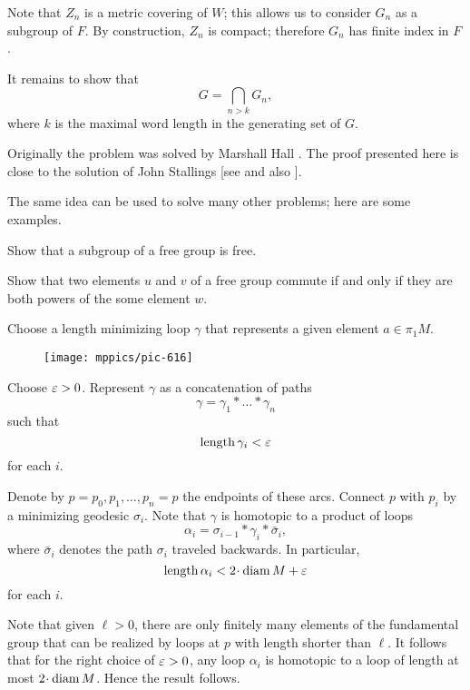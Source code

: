 Note that $Z_n$ is a metric covering of $W$;
this allows us to consider $G_n$ as a subgroup of $F$.
By construction, $Z_n$ is compact;
therefore $G_n$ has finite index in $F$.


It remains to show that 
\[G=\bigcap_{n>k} G_n,\]
where $k$ is the maximal word length in the generating set of $G$.
\qeds

Originally the problem was solved by Marshall Hall \cite{hall}.
The proof presented here is close to the solution of John Stallings [see  and also ].

The same idea can be used to solve many other problems; here are some examples.

\begin{pr}
 Show that a subgroup of a free group is free.
\end{pr}

\begin{pr}
 Show that two elements $u$ and $v$ of a free group commute 
if and only if they are both powers of
the some element $w$.
\end{pr}




Choose a length minimizing loop $\gamma$ that represents a given element $a\in\pi_1M$.

\begin{wrapfigure}{o}{20 mm}
\vskip-4mm
\centering
\texttt{[image: mppics/pic-616]}
\end{wrapfigure}

Choose $\varepsilon>0$.
Represent $\gamma$ 
as a concatenation of paths
\[\gamma=\gamma_1{*}\dots{*}\gamma_n\]
such that
\[\operatorname{\rm length}\gamma_i<\varepsilon\] 
for each $i$.

 
Denote by $p=p_0,p_1,\dots, p_n=p$ the endpoints of these arcs.
Connect $p$ with $p_i$ by a minimizing geodesic $\sigma_i$.
Note that $\gamma$ is homotopic to a product of loops
\[\alpha_i=\sigma_{i-1}{*}\gamma_i{*}\bar\sigma_{i},\]
where $\bar\sigma_{i}$ denotes the path $\sigma_{i}$ traveled backwards.
In particular,
\[\length \alpha_i<2\cdot\diam M+\eps \]
for each $i$.

Note that given $\ell>0$, there are only finitely many elements of the fundamental group that can be realized by loops at $p$ with length shorter than $\ell$.
It follows that for the right choice of $\varepsilon>0$, 
any loop $\alpha_i$ is homotopic to a loop of length at most $2\cdot\diam M$.
Hence the result follows.
\qeds

